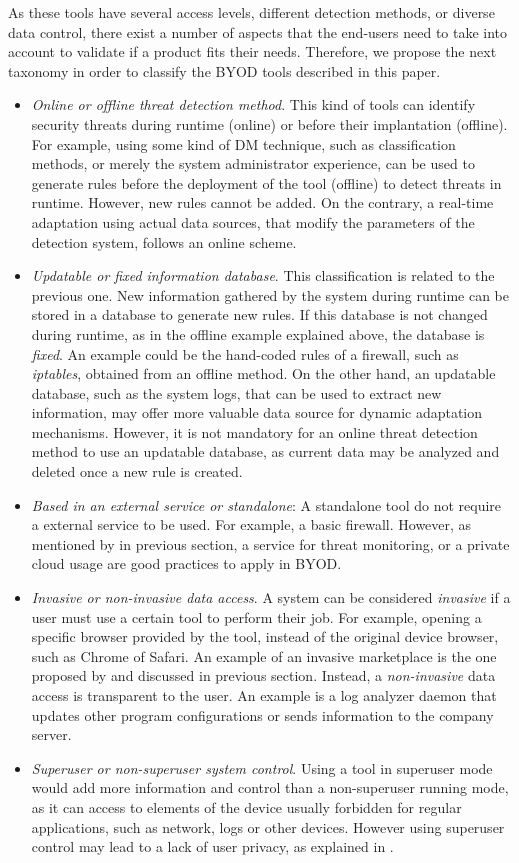 As these tools have several access levels, different detection methods, or diverse data control, there exist a number of aspects that the end-users need to take into account to validate if a product fits their needs. Therefore, we propose the next taxonomy in order to classify the BYOD tools described in this paper.

\begin{itemize}
\item {\em Online or offline threat detection method}. This kind of tools can identify security threats during runtime (online) or before their implantation (offline). For example, using some kind of DM technique, such as classification methods, or merely the system administrator experience, can be used to generate rules before the deployment of the tool (offline) to detect threats in runtime. However, new rules cannot be added. On the contrary, a real-time adaptation using actual data sources, that modify the parameters of the detection system, follows an online scheme.
\item {\em Updatable or fixed information database}. This classification is related to the previous one. New information gathered by the system during runtime can be stored in a database to generate new rules. If this database is not changed during runtime, as in the offline example explained above, the database is {\em fixed}. An example could be the hand-coded rules of a firewall, such as {\em iptables}, obtained from an offline method. On the other hand, an updatable database, such as the system logs, that can be used to extract new information, may offer more valuable data source for dynamic adaptation mechanisms. However, it is not mandatory for an online threat detection method to use an updatable database, as current data may be analyzed and deleted once a new rule is created. 
\item {\em Based in an external service or standalone}: A standalone tool do not require a external service to be used. For example, a basic firewall. However, as mentioned by \cite{Romer14BestPractices} in previous section, a service for threat monitoring, or a private cloud usage are good practices to apply in BYOD.
\item {\em Invasive or non-invasive data access}. A system can be considered {\em invasive} if a user must use a certain tool to perform their job. For example, opening a specific browser provided by the tool, instead of the original device browser, such as Chrome of Safari. An example of an invasive marketplace is the one proposed by \cite{Armando14metamarket} and discussed in previous section. Instead, a {\em non-invasive} data access is transparent to the user. An example is a log analyzer daemon that updates other program configurations or sends information to the company server.
\item {\em Superuser or non-superuser system control}. Using a tool in superuser mode would add more information and control than a non-superuser running mode, as it can access to elements of the device usually forbidden for regular applications, such as network, logs or other devices. However using superuser control may lead to a lack of user privacy, as explained in \cite{Gessner13userfriendly}.
\end{itemize}


